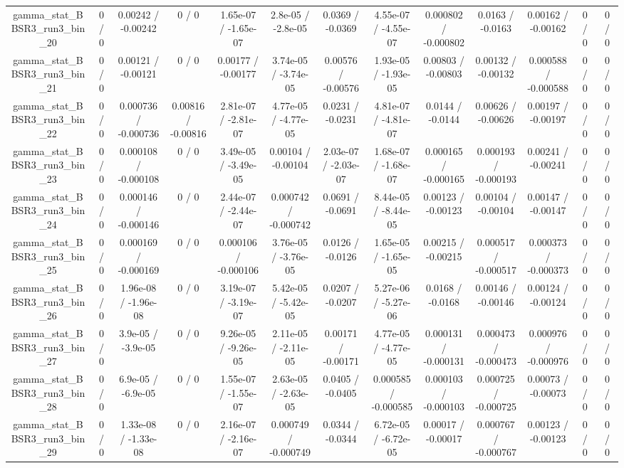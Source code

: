 \documentclass[10pt]{article}
\begin{document}
\begin{table}[htbp]
\begin{center}
\begin{tabular}{|c|c|c|c|c|c|c|c|c|c|c|c|c|}
  gamma_stat_BBSR3_run3_bin_20 & 0 / 0 & 0.00242 / -0.00242 & 0 / 0 & 1.65e-07 / -1.65e-07 & 2.8e-05 / -2.8e-05 & 0.0369 / -0.0369 & 4.55e-07 / -4.55e-07 & 0.000802 / -0.000802 & 0.0163 / -0.0163 & 0.00162 / -0.00162 & 0 / 0 & 0 / 0 \\ 
  gamma_stat_BBSR3_run3_bin_21 & 0 / 0 & 0.00121 / -0.00121 & 0 / 0 & 0.00177 / -0.00177 & 3.74e-05 / -3.74e-05 & 0.00576 / -0.00576 & 1.93e-05 / -1.93e-05 & 0.00803 / -0.00803 & 0.00132 / -0.00132 & 0.000588 / -0.000588 & 0 / 0 & 0 / 0 \\ 
  gamma_stat_BBSR3_run3_bin_22 & 0 / 0 & 0.000736 / -0.000736 & 0.00816 / -0.00816 & 2.81e-07 / -2.81e-07 & 4.77e-05 / -4.77e-05 & 0.0231 / -0.0231 & 4.81e-07 / -4.81e-07 & 0.0144 / -0.0144 & 0.00626 / -0.00626 & 0.00197 / -0.00197 & 0 / 0 & 0 / 0 \\ 
  gamma_stat_BBSR3_run3_bin_23 & 0 / 0 & 0.000108 / -0.000108 & 0 / 0 & 3.49e-05 / -3.49e-05 & 0.00104 / -0.00104 & 2.03e-07 / -2.03e-07 & 1.68e-07 / -1.68e-07 & 0.000165 / -0.000165 & 0.000193 / -0.000193 & 0.00241 / -0.00241 & 0 / 0 & 0 / 0 \\ 
  gamma_stat_BBSR3_run3_bin_24 & 0 / 0 & 0.000146 / -0.000146 & 0 / 0 & 2.44e-07 / -2.44e-07 & 0.000742 / -0.000742 & 0.0691 / -0.0691 & 8.44e-05 / -8.44e-05 & 0.00123 / -0.00123 & 0.00104 / -0.00104 & 0.00147 / -0.00147 & 0 / 0 & 0 / 0 \\ 
  gamma_stat_BBSR3_run3_bin_25 & 0 / 0 & 0.000169 / -0.000169 & 0 / 0 & 0.000106 / -0.000106 & 3.76e-05 / -3.76e-05 & 0.0126 / -0.0126 & 1.65e-05 / -1.65e-05 & 0.00215 / -0.00215 & 0.000517 / -0.000517 & 0.000373 / -0.000373 & 0 / 0 & 0 / 0 \\ 
  gamma_stat_BBSR3_run3_bin_26 & 0 / 0 & 1.96e-08 / -1.96e-08 & 0 / 0 & 3.19e-07 / -3.19e-07 & 5.42e-05 / -5.42e-05 & 0.0207 / -0.0207 & 5.27e-06 / -5.27e-06 & 0.0168 / -0.0168 & 0.00146 / -0.00146 & 0.00124 / -0.00124 & 0 / 0 & 0 / 0 \\ 
  gamma_stat_BBSR3_run3_bin_27 & 0 / 0 & 3.9e-05 / -3.9e-05 & 0 / 0 & 9.26e-05 / -9.26e-05 & 2.11e-05 / -2.11e-05 & 0.00171 / -0.00171 & 4.77e-05 / -4.77e-05 & 0.000131 / -0.000131 & 0.000473 / -0.000473 & 0.000976 / -0.000976 & 0 / 0 & 0 / 0 \\ 
  gamma_stat_BBSR3_run3_bin_28 & 0 / 0 & 6.9e-05 / -6.9e-05 & 0 / 0 & 1.55e-07 / -1.55e-07 & 2.63e-05 / -2.63e-05 & 0.0405 / -0.0405 & 0.000585 / -0.000585 & 0.000103 / -0.000103 & 0.000725 / -0.000725 & 0.00073 / -0.00073 & 0 / 0 & 0 / 0 \\ 
  gamma_stat_BBSR3_run3_bin_29 & 0 / 0 & 1.33e-08 / -1.33e-08 & 0 / 0 & 2.16e-07 / -2.16e-07 & 0.000749 / -0.000749 & 0.0344 / -0.0344 & 6.72e-05 / -6.72e-05 & 0.00017 / -0.00017 & 0.000767 / -0.000767 & 0.00123 / -0.00123 & 0 / 0 & 0 / 0 \\ 

\end{tabular}
\end{center}
\end{table}
\end{document}
